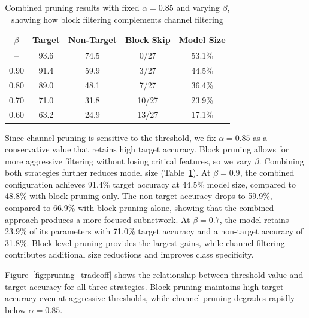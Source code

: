 \documentclass[
12pt,
fancyheadings,
a4paper,
twoside,
BCOR=0.7cm,
nobcorignoretitle,
grayscalebody,
]{stsreprt}
\begin{document}
\begin{table}[ht]
\centering
\caption{Combined pruning results with fixed $\alpha = 0.85$ and varying $\beta$, showing how block filtering complements channel filtering}
\label{tab:combined_pruning}
\begin{tabular}{ccccc}
\toprule
\textbf{$\beta$} & \textbf{Target} & \textbf{Non-Target} & \textbf{Block Skip} & \textbf{Model Size} \\
\midrule
-- & 93.6 & 74.5 & 0/27 & 53.1\% \\
\midrule
0.90 & 91.4 & 59.9 & 3/27 & 44.5\% \\
0.80 & 89.0 & 48.1 & 7/27 & 36.4\% \\
0.70 & 71.0 & 31.8 & 10/27 & 23.9\% \\
0.60 & 63.2 & 24.9 & 13/27 & 17.1\% \\
\bottomrule
\end{tabular}
\end{table}

Since channel pruning is sensitive to the threshold, we fix $\alpha = 0.85$ as a conservative value
that retains high target accuracy.
Block pruning allows for more aggressive filtering without losing critical features, so we vary
$\beta$.
Combining both strategies further reduces model size (Table~\ref{tab:combined_pruning}).
At $\beta = 0.9$, the combined configuration achieves 91.4\% target accuracy at 44.5\% model size,
compared to 48.8\% with block pruning only.
The non-target accuracy drops to 59.9\%, compared to 66.9\% with block pruning alone, showing that
the combined approach produces a more focused subnetwork.
At $\beta = 0.7$, the model retains 23.9\% of its parameters with 71.0\% target accuracy and a
non-target accuracy of 31.8\%.
Block-level pruning provides the largest gains, while channel filtering contributes additional size
reductions and improves class specificity.

Figure~\ref{fig:pruning_tradeoff} shows the relationship between threshold value and target
accuracy for all three strategies.
Block pruning maintains high target accuracy even at aggressive thresholds, while channel pruning
degrades rapidly below $\alpha = 0.85$.
\end{document}
